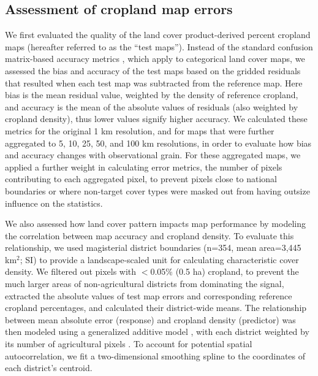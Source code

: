 \documentclass[a4paper]{article}
\begin{document}
\subsection*{Assessment of cropland map errors}
\vspace{-0.2 cm}
We first evaluated the quality of the land cover product-derived percent cropland maps (hereafter referred to as the ``test maps''). Instead of the standard confusion matrix-based accuracy metrics \citep{olofsson_good_2014,olofsson_making_2013}, which apply to categorical land cover maps, we assessed the bias and accuracy of the test maps based on the gridded residuals that resulted when each test map was subtracted from the reference map. Here bias is the mean residual value, weighted by the density of reference cropland, and accuracy is the mean of the absolute values of residuals (also weighted by cropland density), thus lower values signify higher accuracy. We calculated these metrics for the original 1 km resolution, and for maps that were further aggregated to 5, 10, 25, 50, and 100 km resolutions, in order to evaluate how bias and accuracy changes with observational grain. For these aggregated maps, we applied a further weight in calculating error metrics, the number of pixels contributing to each aggregated pixel, to prevent pixels close to national boundaries or where non-target cover types were masked out from having outsize influence on the statistics. 

We also assessed how land cover pattern impacts map performance by modeling the correlation between map accuracy and cropland density.  To evaluate this relationship, we used magisterial district boundaries (n=354, mean area=3,445 km$^2$; SI) to provide a landscape-scaled unit for calculating characteristic cover density. We filtered out pixels with $<$0.05\% (0.5 ha) cropland, to prevent the much larger areas of non-agricultural districts from dominating the signal, extracted the absolute values of test map errors and corresponding reference cropland percentages, and calculated their district-wide means. The relationship between mean absolute error (response) and cropland density (predictor) was then modeled using a generalized additive model \citep{hastie_generalized_1990}, with each district weighted by its number of agricultural pixels \citep{wood_mgcv:_2001}. To account for potential spatial autocorrelation, we fit a two-dimensional smoothing spline to the coordinates of each district's centroid.

\vspace{-0.3 cm}
\end{document}
